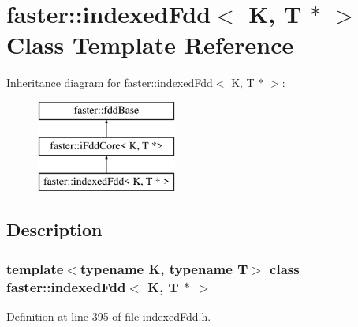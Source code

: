 \hypertarget{classfaster_1_1indexedFdd_3_01K_00_01T_01_5_01_4}{}\section{faster\+:\+:indexed\+Fdd$<$ K, T $\ast$ $>$ Class Template Reference}
\label{classfaster_1_1indexedFdd_3_01K_00_01T_01_5_01_4}
Inheritance diagram for faster\+:\+:indexed\+Fdd$<$ K, T $\ast$ $>$\+:\begin{figure}[H]
\begin{center}
\leavevmode
\includegraphics[height=3.000000cm]{classfaster_1_1indexedFdd_3_01K_00_01T_01_5_01_4}
\end{center}
\end{figure}


\subsection{Description}
\subsubsection*{template$<$typename K, typename T$>$\newline
class faster\+::indexed\+Fdd$<$ K, T $\ast$ $>$}



Definition at line 395 of file indexed\+Fdd.\+h.

